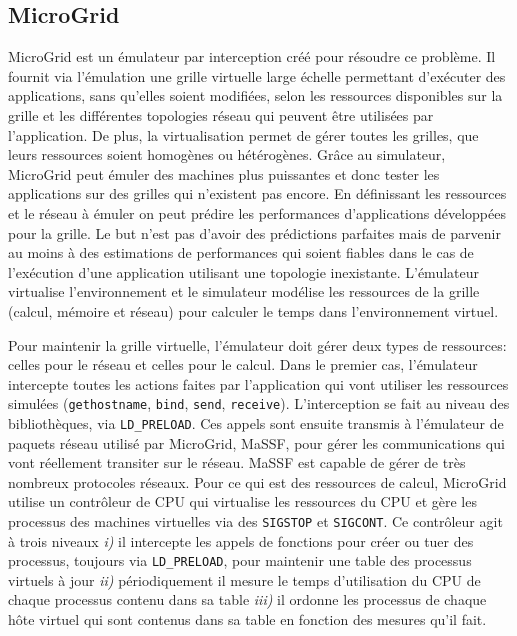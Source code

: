 \subsection{MicroGrid}
\label{subsection:MicroGrid}
MicroGrid \citep{MICROGRID_INIT, MICROGRID_CASANOVA} est un émulateur par interception créé pour résoudre ce problème. Il fournit via l'émulation une grille virtuelle large échelle permettant d'exécuter des applications, sans qu'elles soient modifiées, selon les ressources disponibles sur la grille et les différentes topologies réseau qui peuvent être utilisées par l'application. De plus, la virtualisation permet de gérer toutes les grilles, que leurs ressources soient homogènes ou hétérogènes. Grâce au simulateur, %
MicroGrid peut émuler des machines plus puissantes et donc tester les applications sur des grilles qui n'existent pas encore. En définissant les ressources et le réseau à émuler on peut prédire les performances d'applications développées pour la grille. Le but n'est pas d'avoir des prédictions parfaites mais de parvenir au moins à des estimations de performances qui soient fiables dans le cas de l'exécution d'une application utilisant une topologie inexistante. L'émulateur virtualise l'environnement et le simulateur modélise les ressources de la grille (calcul, mémoire et réseau) pour calculer le temps dans l'environnement virtuel.

Pour maintenir la grille virtuelle, l'émulateur doit gérer deux types de ressources: celles pour le réseau et celles pour le calcul. Dans le premier cas, l'émulateur intercepte toutes les actions faites par l'application qui vont utiliser les ressources simulées (\texttt{gethostname}, \texttt{bind}, \texttt{send}, \texttt{receive}). L'interception se fait au niveau des bibliothèques, via \texttt{LD\_PRELOAD}. Ces appels sont ensuite transmis à l'émulateur de paquets réseau utilisé par MicroGrid, MaSSF, pour gérer les communications qui vont réellement transiter sur le réseau. MaSSF est capable de gérer de très nombreux protocoles réseaux.  Pour ce qui est des ressources de calcul, MicroGrid utilise un contrôleur de CPU qui virtualise les ressources du CPU et gère les processus des machines virtuelles via des \texttt{SIGSTOP} et \texttt{SIGCONT}. Ce contrôleur agit à trois niveaux \textit{i)} il intercepte les appels de fonctions pour créer ou tuer des processus, toujours via \texttt{LD\_PRELOAD}, pour maintenir une table des processus virtuels à jour \textit{ii)} périodiquement il mesure le temps d'utilisation du CPU de chaque processus contenu dans sa table \textit{iii)} il ordonne les processus de chaque hôte virtuel qui sont contenus dans sa table en fonction des mesures qu'il fait.

